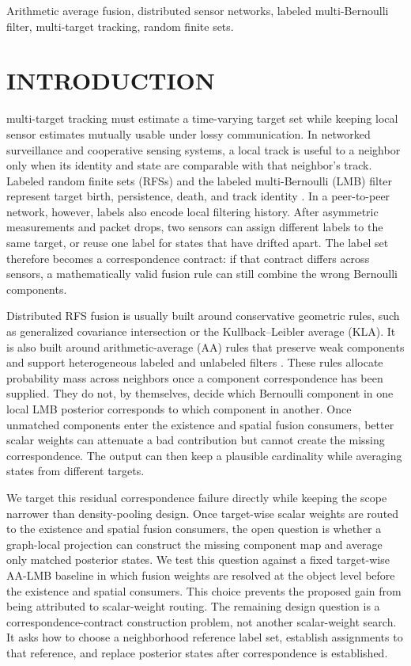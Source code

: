 \documentclass{IEEEtaes}
\newcommand{\LMB}{labeled multi-Bernoulli}
\begin{document}
\begin{IEEEkeywords}
Arithmetic average fusion, distributed sensor networks, labeled multi-Bernoulli filter, multi-target tracking, random finite sets.
\end{IEEEkeywords}

\section{INTRODUCTION}
 multi-target tracking must estimate a time-varying target set while keeping local sensor estimates mutually usable under lossy communication. In networked surveillance and cooperative sensing systems, a local track is useful to a neighbor only when its identity and state are comparable with that neighbor's track. Labeled random finite sets (RFSs) and the \LMB{} (LMB) filter represent target birth, persistence, death, and track identity \cite{Vo2014LRFS,Reuter2014LMB}. In a peer-to-peer network, however, labels also encode local filtering history. After asymmetric measurements and packet drops, two sensors can assign different labels to the same target, or reuse one label for states that have drifted apart. The label set therefore becomes a correspondence contract: if that contract differs across sensors, a mathematically valid fusion rule can still combine the wrong Bernoulli components.

Distributed RFS fusion is usually built around conservative geometric rules, such as generalized covariance intersection or the Kullback--Leibler average (KLA). It is also built around arithmetic-average (AA) rules that preserve weak components and support heterogeneous labeled and unlabeled filters \cite{Battistelli2014KLA,Wang2017MBGCI,Li2018RobustDistributedLRFS,Li2024AADensityFusion}. These rules allocate probability mass across neighbors once a component correspondence has been supplied. They do not, by themselves, decide which Bernoulli component in one local LMB posterior corresponds to which component in another. Once unmatched components enter the existence and spatial fusion consumers, better scalar weights can attenuate a bad contribution but cannot create the missing correspondence. The output can then keep a plausible cardinality while averaging states from different targets.

We target this residual correspondence failure directly while keeping the scope narrower than density-pooling design. Once target-wise scalar weights are routed to the existence and spatial fusion consumers, the open question is whether a graph-local projection can construct the missing component map and average only matched posterior states. We test this question against a fixed target-wise AA-LMB baseline in which fusion weights are resolved at the object level before the existence and spatial consumers. This choice prevents the proposed gain from being attributed to scalar-weight routing. The remaining design question is a correspondence-contract construction problem, not another scalar-weight search. It asks how to choose a neighborhood reference label set, establish assignments to that reference, and replace posterior states after correspondence is established.
\end{document}
